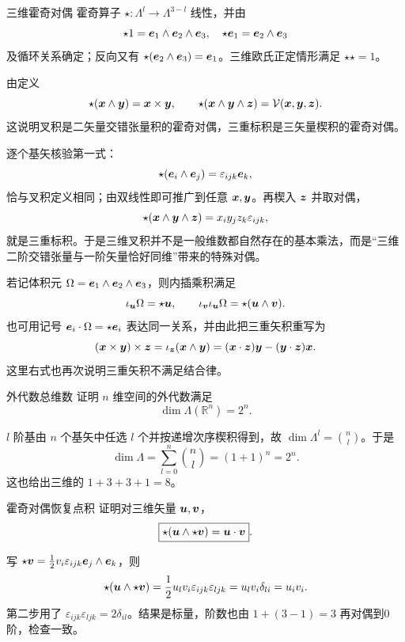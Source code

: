 \begin{advdefinition}{三维霍奇对偶}\label{advA3:def:hodge}
霍奇算子 $\star:\Lambda^l\to\Lambda^{3-l}$ 线性，并由
\[
 \star1=\bm{e}_1\wedge\bm{e}_2\wedge\bm{e}_3,
 \quad
 \star\bm{e}_1=\bm{e}_2\wedge\bm{e}_3
\]
及循环关系确定；反向又有
$\star(\bm{e}_2\wedge\bm{e}_3)=\bm{e}_1$。三维欧氏正定情形满足 $\star\star=1$。
\end{advdefinition}
由定义
\[
 \star(\bm{x}\wedge\bm{y})=\bm{x}\times\bm{y},
 \qquad
 \star(\bm{x}\wedge\bm{y}\wedge\bm{z})
 =\mathcal V(\bm{x},\bm{y},\bm{z}).
\]
这说明叉积是二矢量交错张量积的霍奇对偶，三重标积是三矢量楔积的霍奇对偶。

逐个基矢核验第一式：
\[
 \star(\bm{e}_i\wedge\bm{e}_j)=\varepsilon_{ijk}\bm{e}_k,
\]
恰与叉积定义相同；由双线性即可推广到任意 $\bm{x},\bm{y}$。再楔入 $\bm{z}$ 并取对偶，
\[
 \star(\bm{x}\wedge\bm{y}\wedge\bm{z})
 =x_iy_jz_k\varepsilon_{ijk},
\]
就是三重标积。于是三维叉积并不是一般维数都自然存在的基本乘法，而是“三维二阶交错张量与一阶矢量恰好同维”带来的特殊对偶。

若记体积元
$\Omega=\bm{e}_1\wedge\bm{e}_2\wedge\bm{e}_3$，则内插乘积满足
\[
 \iota_{\bm{u}}\Omega=\star\bm{u},
 \qquad \iota_{\bm{v}}\iota_{\bm{u}}\Omega
 =\star(\bm{u}\wedge\bm{v}).
\]
也可用记号 $\bm{e}_i\cdot\Omega=\star\bm{e}_i$ 表达同一关系，并由此把三重矢积重写为
\[
 (\bm{x}\times\bm{y})\times\bm{z}
 =\iota_{\bm{z}}(\bm{x}\wedge\bm{y})
 =(\bm{x}\cdot\bm{z})\bm{y}-(\bm{y}\cdot\bm{z})\bm{x}.
\]
这里右式也再次说明三重矢积不满足结合律。

\begin{advexamplebox}{外代数总维数}\label{advA3:ex:exterior-dimension}
证明 $n$ 维空间的外代数满足
\[
 \dim\Lambda(\mathbb R^n)=2^n.
\]

\AQExterior
\end{advexamplebox}
\begin{advsolution}
\AAExterior

$l$ 阶基由 $n$ 个基矢中任选 $l$ 个并按递增次序楔积得到，故
$\dim\Lambda^l=\binom nl$。于是
\[
 \dim\Lambda=\sum_{l=0}^n\binom nl=(1+1)^n=2^n.
\]
这也给出三维的 $1+3+3+1=8$。
\end{advsolution}

\begin{advexamplebox}{霍奇对偶恢复点积}\label{advA3:ex:hodge-dot}
证明对三维矢量 $\bm{u},\bm{v}$，
\[
 \boxed{\star(\bm{u}\wedge\star\bm{v})=\bm{u}\cdot\bm{v}}.
\]

\AQHodge
\end{advexamplebox}
\begin{advsolution}
\AAHodge

写 $\star\bm{v}=\tfrac12v_i\varepsilon_{ijk}\bm{e}_j\wedge\bm{e}_k$，则
\[
 \star(\bm{u}\wedge\star\bm{v})
 =\frac12u_lv_i\varepsilon_{ijk}\varepsilon_{ljk}
 =u_lv_i\delta_{li}=u_iv_i.
\]
第二步用了 $\varepsilon_{ijk}\varepsilon_{ljk}=2\delta_{il}$。结果是标量，阶数也由
$1+(3-1)=3$ 再对偶到0阶，检查一致。
\end{advsolution}

